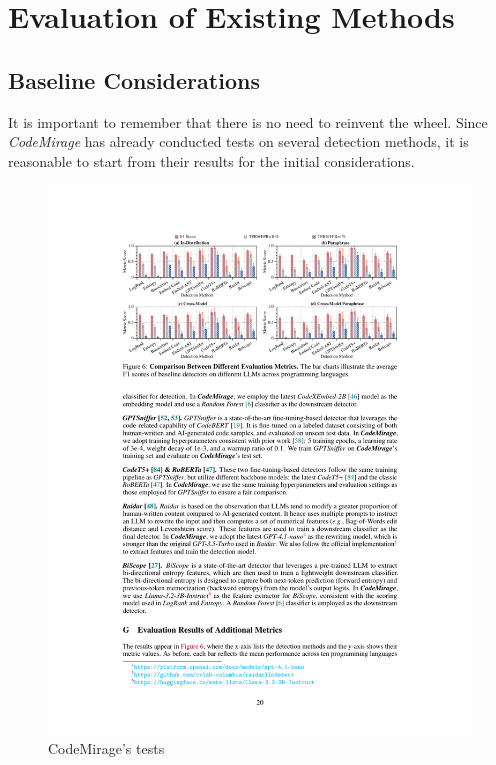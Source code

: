 \section{Evaluation of Existing Methods}
\subsection{Baseline Considerations}
It is important to remember that there is no need to 
reinvent the wheel. Since \textit{CodeMirage} has already 
conducted tests on several detection methods, it is 
reasonable to start from their results for the initial 
considerations.

\begin{figure}[H]
    \centering
    \includegraphics[width=1\textwidth]{img/tests/CodeMirage-tests.pdf}
    \caption{CodeMirage's tests}
    \label{fig:CodeMirage-tests}
\end{figure}

